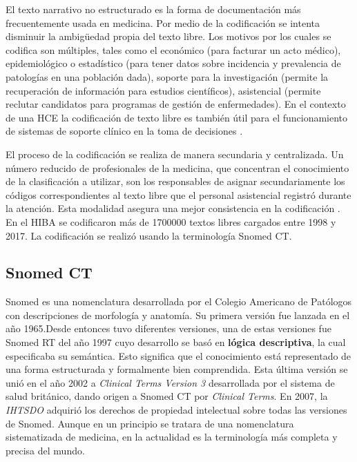 El texto narrativo no estructurado es la forma de documentación más frecuentemente usada en medicina. Por medio de la codificación se intenta disminuir la ambigüedad propia del texto libre. Los motivos por los cuales se codifica son múltiples, tales como el económico (para facturar un acto médico), epidemiológico o estadístico (para tener datos sobre incidencia y prevalencia de patologías en una población dada), soporte para la investigación (permite la recuperación de información para estudios científicos), asistencial (permite reclutar candidatos para programas de gestión de enfermedades). En el contexto de una \acrshort{HCE} la codificación de texto libre es también útil para el funcionamiento de sistemas de soporte clínico en la toma de decisiones \cite{lopez2004codificacion,lopez2002creacion}. 

El proceso de la codificación se realiza de manera secundaria y centralizada. Un número reducido de profesionales de la medicina, que concentran el conocimiento de la clasificación a utilizar, son los responsables de asignar secundariamente los códigos correspondientes al texto libre que el personal asistencial registró durante la atención. Esta modalidad asegura una mejor consistencia en la codificación \cite{lopez2004codificacion,lopez2005desarrollo}. En el \acrshort{HIBA} se codificaron  más de \num{1700000} textos libres cargados entre \num{1998} y \num{2017}. La codificación se realizó usando la terminología Snomed CT.

\subsection{Snomed CT}
Snomed es una nomenclatura desarrollada por el Colegio Americano de Patólogos con descripciones de morfología y anatomía. Su primera versión fue lanzada en el año \num{1965}.Desde entonces tuvo diferentes versiones, una de estas versiones fue Snomed RT del año 1997 cuyo desarrollo se basó en \textbf{lógica descriptiva}, la cual especificaba su semántica. Esto significa que el conocimiento está representado de una forma estructurada y formalmente bien comprendida. Esta última versión se unió en el año \num{2002} a \textit{Clinical Terms Version 3} desarrollada por el sistema de salud británico, dando origen a Snomed CT por \textit{Clinical Terms}. En 2007, la \textit{\acrfull{IHTSDO}} adquirió los derechos de propiedad intelectual sobre todas las versiones de Snomed. Aunque en un principio se tratara de una nomenclatura sistematizada de medicina, en la actualidad es la terminología más completa y precisa del mundo. \cite{Bhattacharyya2016}

